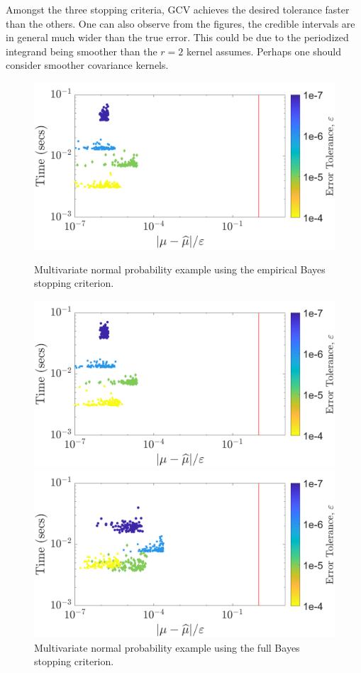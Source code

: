 \documentclass[twocolumn]{svjour3}          %
\begin{document}
Amongst the three stopping criteria, GCV achieves the desired tolerance faster than the others. 
One can also observe from the figures, the credible intervals are in general much wider than the true error.
This could be due to the periodized integrand being smoother than the $r=2$ kernel assumes. Perhaps one should consider smoother covariance kernels.

\begin{figure}
	\centering
	\includegraphics[width=0.98\linewidth]{"MVN_guaranteed_time_MLE_C2sin_d2_r2_2018-Sep-6"}
	\caption[Guaranteed:]{Multivariate normal probability example using the empirical Bayes stopping criterion.}
	\label{fig:mvn-guaranteed-MLE}
	\centering
	\includegraphics[width=0.98\linewidth]{"MVN_guaranteed_time_full_C2sin_d2_r2_2018-Sep-6"}
	\caption[MVN guaranteed : FB]{Multivariate normal probability example using the full Bayes stopping criterion.}
	\label{fig:mvn-guaranteed-FB}
	\centering
	\includegraphics[width=0.98\linewidth]{"MVN_guaranteed_time_GCV_C2sin_d2_r2_2018-Sep-6"}

\end{figure}
\end{document}
